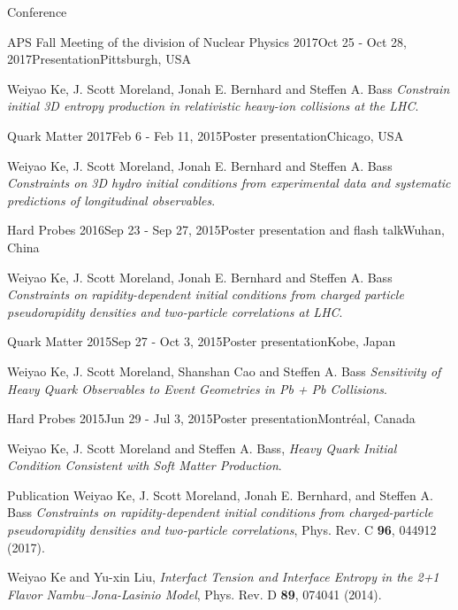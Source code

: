 \documentclass{resume} %
\begin{document}
\begin{rSection}{Conference}

\begin{rSubsection}{APS Fall Meeting of the division of Nuclear Physics 2017}{Oct 25 - Oct 28, 2017}{Presentation}{Pittsburgh, USA}
\item Weiyao Ke, J. Scott Moreland, Jonah E. Bernhard and Steffen A. Bass {\it Constrain initial 3D entropy production in relativistic heavy-ion collisions at the LHC}.
\end{rSubsection}

\begin{rSubsection}{Quark Matter 2017}{Feb 6 - Feb 11, 2015}{Poster presentation}{Chicago, USA}
\item Weiyao Ke, J. Scott Moreland, Jonah E. Bernhard and Steffen A. Bass {\it Constraints on 3D hydro initial conditions from experimental data and systematic predictions of longitudinal observables}.
\end{rSubsection}

\begin{rSubsection}{Hard Probes 2016}{Sep 23 - Sep 27, 2015}{Poster presentation and flash talk}{Wuhan, China}
\item Weiyao Ke, J. Scott Moreland, Jonah E. Bernhard and Steffen A. Bass {\it Constraints on rapidity-dependent initial conditions from charged particle pseudorapidity densities and two-particle correlations at LHC}.
\end{rSubsection}

\begin{rSubsection}{Quark Matter 2015}{Sep 27 - Oct 3, 2015}{Poster presentation}{Kobe, Japan}
\item Weiyao Ke, J. Scott Moreland, Shanshan Cao and Steffen A. Bass {\it Sensitivity of Heavy Quark Observables to Event Geometries in Pb + Pb Collisions}.
\end{rSubsection}

\begin{rSubsection}{Hard Probes 2015}{Jun 29 - Jul 3, 2015}{Poster presentation}{Montr\'eal, Canada}
\item Weiyao Ke, J. Scott Moreland and Steffen A. Bass, {\it Heavy Quark Initial Condition Consistent with Soft Matter Production}.
\end{rSubsection}

\end{rSection}

\begin{rSection}{Publication}
Weiyao Ke, J. Scott Moreland, Jonah E. Bernhard, and Steffen A. Bass {\it Constraints on rapidity-dependent initial conditions from charged-particle pseudorapidity densities and two-particle correlations}, Phys. Rev. C {\bf 96}, 044912 (2017).

Weiyao Ke and Yu-xin Liu, {\it Interfact Tension and Interface Entropy in the 2+1 Flavor Nambu--Jona-Lasinio Model}, Phys. Rev. D {\bf 89}, 074041 (2014).

\end{rSection}
\end{document}
